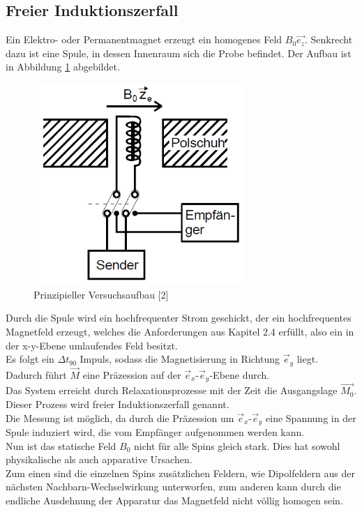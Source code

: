 \documentclass[]{scrartcl}
\begin{document}
\subsection{Freier Induktionszerfall}
Ein Elektro- oder Permanentmagnet erzeugt ein homogenes Feld $B_0\vec{e_z}$. 
Senkrecht dazu ist eine Spule, in dessen Innenraum sich die Probe befindet. Der Aufbau ist in Abbildung \ref{fig::aufbau} abgebildet.
\begin{figure}[H]
\centering
\includegraphics[width=8cm]{images/versuchsaufbau.png}
\caption{Prinzipieller Versuchsaufbau [2]}
\label{fig::aufbau}
\end{figure}
Durch die Spule wird ein hochfrequenter Strom geschickt, der ein hochfrequentes Magnetfeld erzeugt, welches die Anforderungen aus Kapitel 2.4 erfüllt, also ein in der x-y-Ebene umlaufendes Feld besitzt.\\
Es folgt ein $\Delta t_{90}$ Impuls, sodass die Magnetisierung in Richtung $\vec{e}_y$ liegt. Dadurch führt $\vec{M}$ eine Präzession auf der $\vec{e}_x$-$\vec{e}_y$-Ebene durch.\\
Das System erreicht durch Relaxationsprozesse mit der Zeit die Ausgangslage $\vec{M_0}$.\\
Dieser Prozess wird freier Induktionszerfall genannt.\\
Die Messung ist möglich, da durch die Präzession um $\vec{e}_x$-$\vec{e}_y$ eine Spannung in der Spule induziert wird, die vom Empfänger aufgenommen werden kann.\\
Nun ist das statische Feld $B_0$ nicht für alle Spins gleich stark. Dies hat sowohl physikalische als auch apparative Ursachen.\\
Zum einen sind die einzelnen Spins zusätzlichen Feldern, wie Dipolfeldern aus der nächsten Nachbarn-Wechselwirkung unterworfen, zum anderen kann durch die endliche Ausdehnung der Apparatur das Magnetfeld nicht völlig homogen sein.\\
\end{document}
